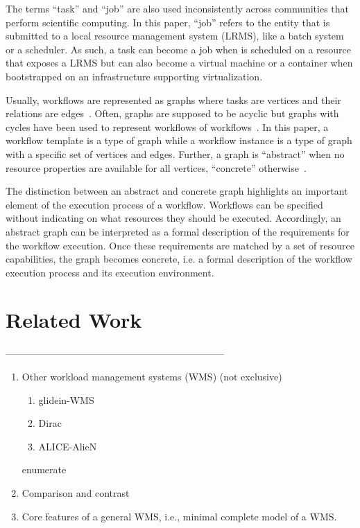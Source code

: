 \documentclass[10pt, conference, compsocconf]{IEEEtran}
\begin{document}
The terms ``task'' and ``job'' are also used inconsistently across communities
that perform scientific computing. In this paper, ``job'' refers to the entity
that is submitted to a local resource management system (LRMS), like a batch
system or a scheduler. As such, a task can become a job when is scheduled on a
resource that exposes a LRMS but can also become a virtual machine or a
container when bootstrapped on an infrastructure supporting virtualization.

Usually, workflows are represented as graphs where tasks are vertices and
their relations are edges~\cite{}. Often, graphs are supposed to be acyclic
but graphs with cycles have been used to represent workflows of
workflows~\cite{}. In this paper, a workflow template is a type of graph while
a workflow instance is a type of graph with a specific set of vertices and
edges. Further, a graph is ``abstract'' when no resource properties are
available for all vertices, ``concrete'' otherwise~\cite{}.

The distinction between an abstract and concrete graph highlights an important
element of the execution process of a workflow. Workflows can be specified
without indicating on what resources they should be executed. Accordingly, an
abstract graph can be interpreted as a formal description of the requirements
for the workflow execution. Once these requirements are matched by a set of
resource capabilities, the graph becomes concrete, i.e. a formal description
of the workflow execution process and its execution environment.

\section{Related Work}
\label{sec:related}

--------------------------------------------------------------------
\begin{enumerate}
  \item Other workload management systems (WMS) (not exclusive)
  \begin{enumerate}
    \item glidein-WMS
    \item Dirac
    \item ALICE-AlieN
  \end{enumerate}
{enumerate}
  \item Comparison and contrast
  \item Core features of a general WMS, i.e., minimal complete model of a WMS.
\end{enumerate}
\end{document}
